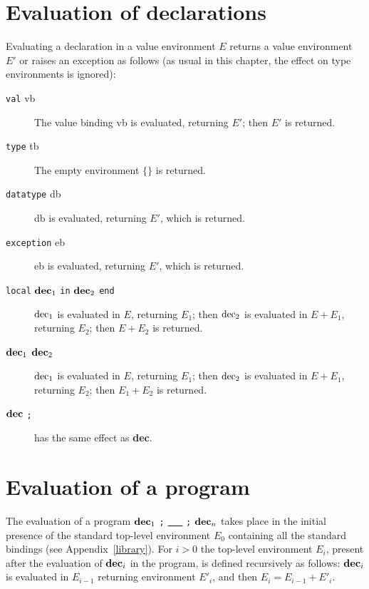\section{Evaluation of declarations}

Evaluating a declaration in a value environment $E$ returns a value
environment $E'$ or raises an exception as follows (as usual in this chapter,
the effect on type environments is ignored):

\begin{description}
\item[\verb"val" vb\hfill] The value binding {\rm vb} is evaluated,
returning $E'$; then $E'$ is returned.

\item[\verb"type" tb\hfill] The empty environment $\{\}$ is returned.

\item[\verb"datatype" db\hfill]  {\rm db} is evaluated, returning
$E'$, which is returned.

\item[\verb"exception" eb\hfill]  {\rm eb} is evaluated, returning
$E'$, which is returned.

\item[\verb"local" ${\bf dec}_1$ \verb"in" ${\bf dec}_2$ \verb"end"\hfill]
${\rm dec}_1$ is evaluated in $E$, returning $E_1$; then 
${\rm dec}_2$ is evaluated in $E+E_1$, returning $E_2$; then $E+E_2$
is returned.

\item[${\bf dec}_1$ ${\bf dec}_2$\hfill]
${\rm dec}_1$ is evaluated in $E$, returning $E_1$; then 
${\rm dec}_2$ is evaluated in $E+E_1$, returning $E_2$; then $E_1+E_2$
is returned.

\item[${\bf dec}$ \verb";"\hfill] has the same effect as {\bf dec}.
\end{description}
\section{Evaluation of a program}
The evaluation of a program ${\bf dec}_1$ \verb";" \underline{\ \ \ }
\verb";" ${\bf dec}_n$ takes place in the initial presence of the
standard top-level environment $E_0$ containing all the standard
bindings (see Appendix~\ref{library}).  For $i>0$ the top-level environment
$E_i$, present after the evaluation of ${\bf dec}_i$ in the program,
is defined recursively as follows:  ${\bf dec}_i$ is evaluated in
$E_{i-1}$ returning environment ${E'}_i$, and then $E_i =
E_{i-1}+{E'}_i$.
